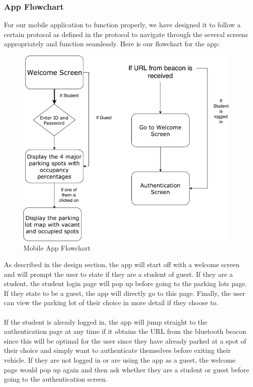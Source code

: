 \documentclass[paper=a4, fontsize=12pt]{scrartcl}
\numberwithin{equation}{section}		%
\numberwithin{figure}{section}			%
\numberwithin{table}{section}				%
\begin{document}
\subsubsection{App Flowchart}
For our mobile application to function properly, we have designed it to follow a certain protocol as defined in the protocol to navigate through the several screens appropriately and function seamlessly. Here is our flowchart for the app:

\begin{figure}[H]
\centering
\includegraphics[width=5in]{MobileAppPics/Mobile App Flowchart (3).pdf}
\caption{Mobile App Flowchart}
\end{figure}

As described in the design section, the app will start off with a welcome screen and will prompt the user to state if they are a student of guest. If they are a student, the student login page will pop up before going to the parking lots page. If they state to be a guest, the app will directly go to this page. Finally, the user can view the parking lot of their choice in more detail if they choose to.
\\\\
If the student is already logged in, the app will jump straight to the authentication page at any time if it obtains the URL from the bluetooth beacon since this will be optimal for the user since they have already parked at a spot of their choice and simply want to authenticate themselves before exiting their vehicle. If they are not logged in or are using the app as a guest, the welcome page would pop up again and then ask whether they are a student or guest before going to the authentication screen.
\end{document}
